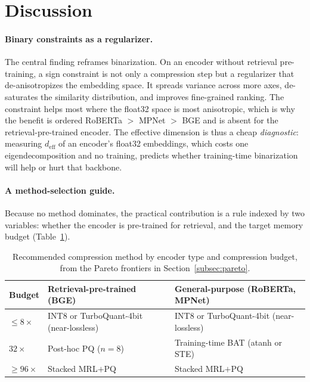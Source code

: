 \section{Discussion}
\label{sec:discussion}

\paragraph{Binary constraints as a regularizer.}
The central finding reframes binarization. On an encoder without retrieval
pre-training, a sign constraint is not only a compression step but a regularizer
that de-anisotropizes the embedding space. It spreads variance across more axes,
de-saturates the similarity distribution, and improves fine-grained ranking. The
constraint helps most where the float32 space is most anisotropic, which is why
the benefit is ordered RoBERTa $>$ MPNet $>$ BGE and is absent for the
retrieval-pre-trained encoder. The effective dimension is thus a cheap
\emph{diagnostic}: measuring $d_{\mathrm{eff}}$ of an encoder's float32
embeddings, which costs one eigendecomposition and no training, predicts whether
training-time binarization will help or hurt that backbone.

\paragraph{A method-selection guide.}
Because no method dominates, the practical contribution is a rule indexed by two
variables: whether the encoder is pre-trained for retrieval, and the target
memory budget (Table~\ref{tab:cheatsheet}).

\begin{table}[t]
  \centering
  \caption{Recommended compression method by encoder type and compression
  budget, from the Pareto frontiers in Section~\ref{subsec:pareto}.}
  \label{tab:cheatsheet}
  \begin{tabular}{lll}
    \toprule
    \textbf{Budget} & \textbf{Retrieval-pre-trained (BGE)} & \textbf{General-purpose (RoBERTa, MPNet)} \\
    \midrule
    $\leq 8\times$        & INT8 or TurboQuant-4bit (near-lossless) & INT8 or TurboQuant-4bit (near-lossless) \\
    $32\times$            & Post-hoc PQ ($n{=}8$)                   & Training-time BAT (atanh or STE) \\
    $\geq 96\times$       & Stacked MRL$+$PQ                        & Stacked MRL$+$PQ \\
    \bottomrule
  \end{tabular}
\end{table}

